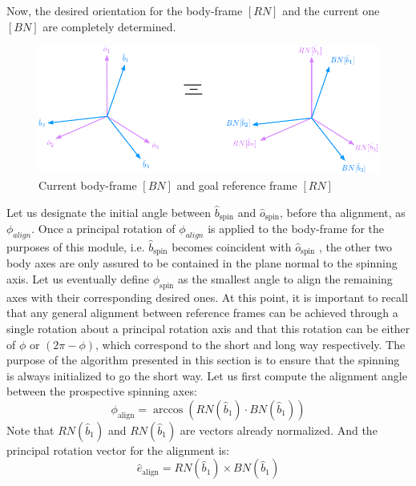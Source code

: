 \documentclass[]{AVSSimReportMemo}
\begin{document}
Now, the desired orientation for the body-frame $[RN]$ and the current one $[BN]$ are completely determined.\newline
\begin{figure}[htb]
	\centerline{
		\includegraphics{Figures/Fig2}
	}
	\caption{Current body-frame $[BN]$ and goal reference frame $[RN]$}
	\label{fig:Fig2}
\end{figure} 
\newline
Let us designate the initial angle between $\hat {b}_{\textrm{spin}}$ and $\hat {o}_{\textrm{spin}}$, before tha alignment, as $\phi_{align}$. Once a principal rotation of $\phi_{align}$ is applied to the body-frame for the purposes of this module, i.e. $\hat {b}_{\textrm{spin}}$ becomes coincident with $\hat {o}_{\textrm{spin}}$ , the other two body axes are only assured to be contained in the plane normal to the spinning axis. Let us eventually define $\phi_{\textrm{spin}}$ as the smallest angle to align the remaining axes with their corresponding desired ones.
At this point, it is important to recall that any general alignment between reference frames can be achieved through a single rotation about a principal rotation axis and that this rotation can be either of $\phi$ or $( 2\pi - \phi)$, which correspond to the short and long way respectively. \newline
The purpose of the algorithm presented in this section is to ensure that the spinning is always initialized to go the short way.
Let us first compute the alignment angle between the prospective spinning axes:
\begin{equation}
	\label{eq:phi_align}
	\phi_{\textrm{align}} = \arccos{(RN(\hat b_{1}) \cdot BN(\hat b_{1}))}
\end{equation}
Note that $RN(\hat b_{1})$ and $RN(\hat b_{1})$ are vectors already normalized.
And the principal rotation vector for the alignment is:
\begin{equation}
	\label{eq:e_hat_align}
	\hat{e}_{\textrm{align}} = RN(\hat b_{1}) \times BN(\hat b_{1})
\end{equation}
\end{document}
